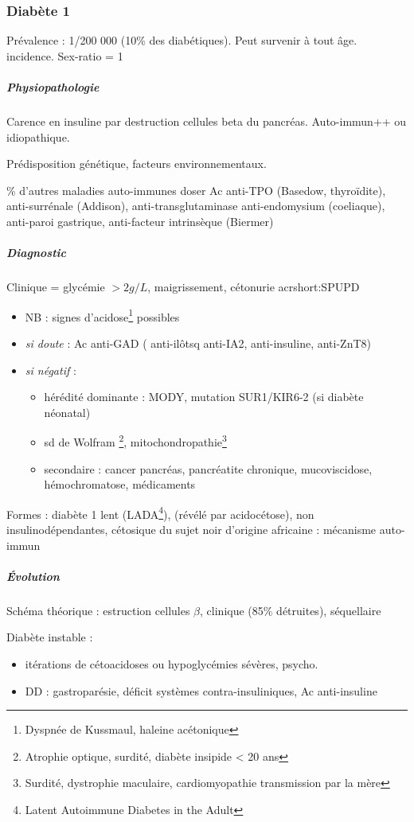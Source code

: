 \documentclass[11pt]{article}
\begin{document}
\subsubsection{Diabète 1}
\label{sec:orgf449c19}
Prévalence : 1/200 000 (10\% des diabétiques). Peut survenir à tout âge. \inc
incidence. Sex-ratio = 1

\subparagraph{Physiopathologie}
\label{sec:org6943447}
Carence en insuline par destruction cellules beta du pancréas. Auto-immun++ ou idiopathique.

Prédisposition génétique, facteurs environnementaux.

\% d'autres maladies auto-immunes \thus doser Ac anti-TPO (Basedow,
thyroïdite), anti-surrénale (Addison), anti-transglutaminase \textpm{} anti-endomysium
(coeliaque), anti-paroi gastrique, anti-facteur intrinsèque (Biermer)

\subparagraph{Diagnostic}
\label{sec:org0c43766}
Clinique =  glycémie \(> 2g/L\), maigrissement, cétonurie \textpm{} acrshort:SPUPD
\begin{itemize}
\item NB : signes d'acidose\footnote{Dyspnée de Kussmaul, haleine acétonique} possibles
\item \emph{si doute} : Ac anti-GAD (\textpm{} anti-ilôtsq anti-IA2, anti-insuline, anti-ZnT8)
\item \emph{si négatif} :
\begin{itemize}
\item hérédité dominante : MODY, mutation SUR1/KIR6-2 (si diabète néonatal)
\item sd de Wolfram \footnote{Atrophie optique, surdité, diabète insipide < 20 ans}, mitochondropathie\footnote{Surdité, dystrophie maculaire, cardiomyopathie transmission par la mère}
\item secondaire : cancer pancréas, pancréatite chronique, mucoviscidose, hémochromatose, médicaments
\end{itemize}
\end{itemize}
Formes : diabète 1 lent (LADA\footnote{Latent Autoimmune Diabetes in the Adult}), (révélé par acidocétose), non insulinodépendantes, cétosique du sujet noir d'origine africaine : mécanisme
   auto-immun

\subparagraph{Évolution}
\label{sec:org7b31cf0}
Schéma théorique : estruction cellules \(\beta\), clinique (85\% détruites), séquellaire

Diabète instable : 
\begin{itemize}
\item itérations de cétoacidoses ou hypoglycémies sévères, psycho.
\item DD : gastroparésie, déficit systèmes contra-insuliniques, Ac anti-insuline
\end{itemize}
\end{document}
